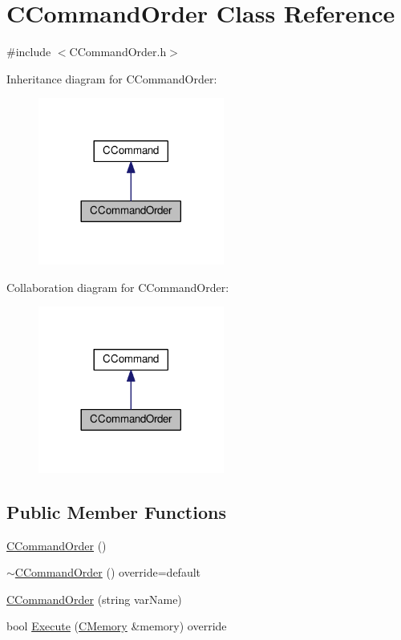 \hypertarget{classCCommandOrder}{}\section{C\+Command\+Order Class Reference}
\label{classCCommandOrder}


{\ttfamily \#include $<$C\+Command\+Order.\+h$>$}



Inheritance diagram for C\+Command\+Order\+:\nopagebreak
\begin{figure}[H]
\begin{center}
\leavevmode
\includegraphics[width=173pt]{classCCommandOrder__inherit__graph}
\end{center}
\end{figure}


Collaboration diagram for C\+Command\+Order\+:\nopagebreak
\begin{figure}[H]
\begin{center}
\leavevmode
\includegraphics[width=173pt]{classCCommandOrder__coll__graph}
\end{center}
\end{figure}
\subsection*{Public Member Functions}
\begin{DoxyCompactItemize}
\item 
\hyperlink{classCCommandOrder_adaa58de546f665fd4a44ab26e7167a6c}{C\+Command\+Order} ()
\item 
\hyperlink{classCCommandOrder_a8afb685cd8016829b9f525002fc77408}{$\sim$\+C\+Command\+Order} () override=default
\item 
\hyperlink{classCCommandOrder_a669df24808e588498231b4c49536d738}{C\+Command\+Order} (string var\+Name)
\item 
bool \hyperlink{classCCommandOrder_a26192670b49e62a03d8ce240c1e2c983}{Execute} (\hyperlink{classCMemory}{C\+Memory} \&memory) override
\end{DoxyCompactItemize}

